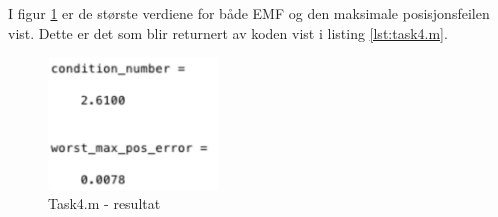 I figur \ref{fig:task4answer} er de største verdiene for både EMF og den maksimale posisjonsfeilen vist. Dette er det som blir returnert av koden vist i listing \ref{lst:task4.m}. 

\begin{figure}[h]
	\centering
	\includegraphics[width=0.4\textwidth]{sections/Exercise4/task4answer.png}
	\caption{Task4.m - resultat}
	\label{fig:task4answer}
\end{figure}